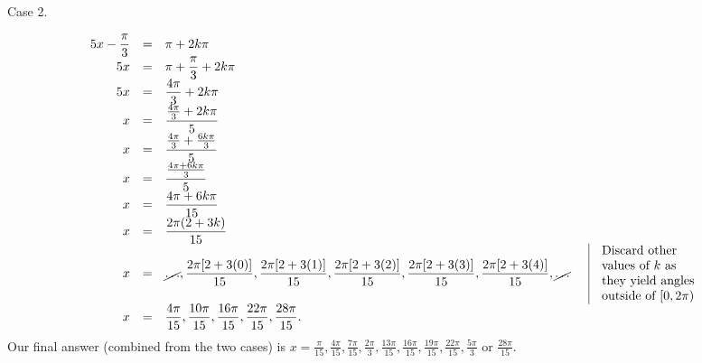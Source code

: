 {\noindent Case 2.

\[
\begin{array}{rcll|l}
\displaystyle 5x-\frac{\pi}{3}&=&\displaystyle \pi+2k\pi\\
\displaystyle 5x&=&\displaystyle \pi+\frac{\pi}{3}+2k\pi\\
\displaystyle 5x&=&\displaystyle \frac{4\pi}{3}+2k\pi\\
\displaystyle x&=&\displaystyle \frac{\frac{4\pi}{3}+2k\pi}{5}\\
\displaystyle x&=&\displaystyle \frac{\frac{4\pi}{3}+\frac{6k\pi}{3}}{5}\\
\displaystyle x&=&\displaystyle \frac{\frac{4\pi+6k\pi}{3}}{5}\\
\displaystyle x&=&\displaystyle \frac{{4\pi+6k\pi}}{15}\\
\displaystyle x&=&\displaystyle \frac{{2\pi(2+3k)}}{15}\\
\displaystyle x&=&\displaystyle \cancel{\dots},\frac{2\pi[2+3(0)]}{15}, \frac{2\pi[2+3(1)]}{15}, \frac{2\pi[2+3(2)]}{15},\frac{2\pi[2+3(3)]}{15},\frac{2\pi[2+3(4)]}{15},\cancel{\dots} &&
\begin{array}{l}
\text{Discard other}\\
\text{values of }k \text{ as} \\
\text{they yield angles}\\
\text{outside of }[0,2\pi)
\end{array}
\\
x&=& \displaystyle \frac{4\pi}{15}, \frac{10\pi}{15}, \frac{16\pi}{15},\frac{22\pi}{15}, \frac{28\pi}{15}.
\end{array}
\]
Our final answer (combined from the two cases) is $\displaystyle x=\frac{\pi}{15}, \frac{4\pi}{15}, \frac{7\pi}{15}, \frac{2\pi}{3}, \frac{13\pi}{15}, \frac{16\pi}{15}, \frac{19\pi}{15}, \frac{22\pi}{15}, \frac{5\pi}{3}$ or $\displaystyle \frac{28\pi}{15}$.
}


